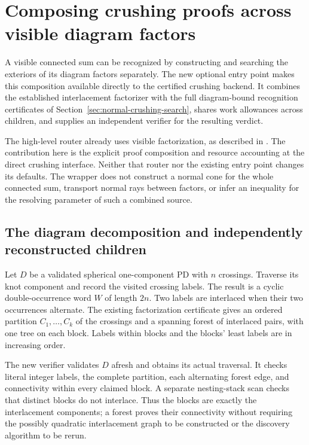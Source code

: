 \section{Composing crushing proofs across visible diagram factors}
\label{sec:factored-crushing}

A visible connected sum can be recognized by constructing and searching
the exteriors of its diagram factors separately.  The new optional entry
point  makes this composition available
directly to the certified crushing backend.  It combines the established
interlacement factorizer with the full diagram-bound recognition certificates
of Section~\ref{sec:normal-crushing-search}, shares work allowances across
children, and supplies an independent verifier for the resulting verdict.

The high-level  router already uses visible factorization,
as described in .  The contribution here is the
explicit proof composition and resource accounting at the direct crushing
interface.  Neither that router nor the existing
 entry point changes its defaults.  The wrapper
does not construct a normal cone for the whole connected sum, transport
normal rays between factors, or infer an inequality for the resolving
parameter of such a combined source.

\subsection{The diagram decomposition and independently reconstructed children}

Let $D$ be a validated spherical one-component PD with $n$ crossings.
Traverse its knot component and record the visited crossing labels.  The
result is a cyclic double-occurrence word $W$ of length $2n$.  Two labels
are interlaced when their two occurrences alternate.  The existing
factorization certificate gives an ordered partition
$C_1,\ldots,C_k$ of the crossings and a spanning forest of interlaced
pairs, with one tree on each block.  Labels within blocks and the blocks'
least labels are in increasing order.

The new verifier validates $D$ afresh and obtains its actual traversal.
It checks literal integer labels, the complete partition, each alternating
forest edge, and connectivity within every claimed block.  A separate
nesting-stack scan checks that distinct blocks do not interlace.  Thus the
blocks are exactly the interlacement components; a forest proves their
connectivity without requiring the possibly quadratic interlacement graph
to be constructed or the discovery algorithm to be rerun.

